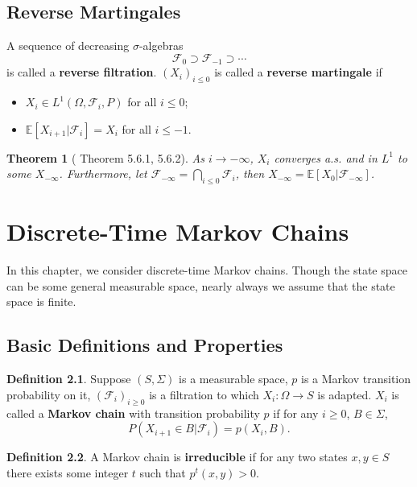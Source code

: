 \documentclass[openany]{book}
\newtheorem{theorem}{Theorem}[chapter]
\theoremstyle{definition}
\newtheorem{definition}{Definition}[chapter]
\theoremstyle{remark}
\begin{document}
\section{Reverse Martingales}
A sequence of decreasing $\sigma$-algebras
\begin{equation*}
    \mathcal{F}_0\supset \mathcal{F}_{-1}\supset\cdots
\end{equation*}
is called a \textbf{reverse filtration}. $(X_i)_{i\le0}$ is called a \textbf{reverse martingale} if
\begin{itemize}
    \item $X_i\in L^1(\Omega,\mathcal{F}_i,P)$ for all $i\le0$;
    \item $\mathbb{E}[X_{i+1}|\mathcal{F}_i]=X_i$ for all $i\le-1$.
\end{itemize}
\begin{theorem}[\cite{D10} Theorem 5.6.1, 5.6.2]
    As $i\to-\infty$, $X_i$ converges a.s. and in $L^1$ to some $X_{-\infty}$. Furthermore, let $\mathcal{F}_{-\infty}=\bigcap_{i\le0}\mathcal{F}_i$, then $X_{-\infty}=\mathbb{E}[X_0|\mathcal{F}_{-\infty}]$.
\end{theorem}

\chapter{Discrete-Time Markov Chains}
In this chapter, we consider discrete-time Markov chains. Though the state space can be some general measurable space, nearly always we assume that the state space is finite.

\section{Basic Definitions and Properties}
\begin{definition}
    Suppose $(S,\Sigma)$ is a measurable space, $p$ is a Markov transition probability on it, $(\mathcal{F}_i)_{i\ge0}$ is a filtration to which $X_i:\Omega\to S$ is adapted. $X_i$ is called a \textbf{Markov chain} with transition probability $p$ if for any $i\ge0$, $B\in\Sigma$,
    \begin{equation*}
        P(X_{i+1}\in B|\mathcal{F}_i)=p(X_i,B).
    \end{equation*}
\end{definition}
\begin{definition}
    A Markov chain is \textbf{irreducible} if for any two states $x,y\in S$ there exists some integer $t$ such that $p^t(x,y)>0$.
\end{definition}
\end{document}
